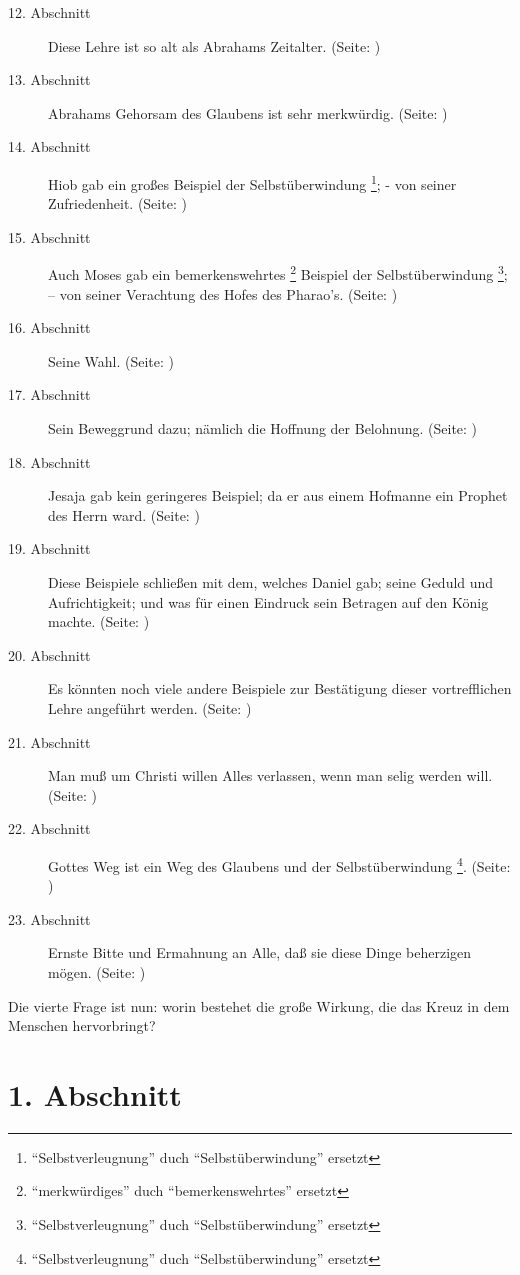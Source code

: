 \begin{description}
\item[12. Abschnitt] Diese Lehre ist so alt als Abrahams Zeitalter. (Seite: \pageref{kap4_ab12})
\item[13. Abschnitt] Abrahams Gehorsam des Glaubens ist sehr merkwürdig. (Seite: \pageref{kap4_ab13})
\item[14. Abschnitt] Hiob gab ein großes Beispiel der Selbstüberwindung \footnote{"`Selbstverleugnung"' duch "`Selbstüberwindung"' ersetzt}; - von
seiner Zufriedenheit. (Seite: \pageref{kap4_ab14})
\item[15. Abschnitt] Auch Moses gab ein bemerkenswehrtes \footnote{"`merkwürdiges"' duch "`bemerkenswehrtes"' ersetzt} Beispiel der
Selbstüberwindung \footnote{"`Selbstverleugnung"' duch "`Selbstüberwindung"' ersetzt}; -- von seiner Verachtung des Hofes des Pharao's. (Seite: \pageref{kap4_ab15})
\item[16. Abschnitt] Seine Wahl. (Seite: \pageref{kap4_ab16})
\item[17. Abschnitt] Sein Beweggrund dazu; nämlich die Hoffnung der Belohnung. (Seite: \pageref{kap4_ab17})
\item[18. Abschnitt] Jesaja gab kein geringeres Beispiel; da er aus einem
Hofmanne ein Prophet des Herrn ward. (Seite: \pageref{kap4_ab18})
\item[19. Abschnitt] Diese Beispiele schließen mit dem, welches Daniel gab;
seine Geduld und Aufrichtigkeit; und was für einen Eindruck sein Betragen auf
den König machte. (Seite: \pageref{kap4_ab19})
\item[20. Abschnitt] Es könnten noch viele andere Beispiele zur Bestätigung
dieser vortrefflichen Lehre angeführt werden. (Seite: \pageref{kap4_ab20})
\item[21. Abschnitt] Man muß um Christi willen Alles verlassen, wenn man selig
werden will. (Seite: \pageref{kap4_ab21})
\item[22. Abschnitt] Gottes Weg ist ein Weg des Glaubens und der
Selbstüberwindung \footnote{"`Selbstverleugnung"' duch "`Selbstüberwindung"' ersetzt}. (Seite: \pageref{kap4_ab22})
\item[23. Abschnitt] Ernste Bitte und Ermahnung an Alle, daß sie diese Dinge
beherzigen mögen. (Seite: \pageref{kap4_ab23})
\end{description}
\normalsize


Die vierte Frage ist nun: worin bestehet die große Wirkung, die das Kreuz in dem
Menschen hervorbringt?

\section{1. Abschnitt} \label{kap4_ab1}

